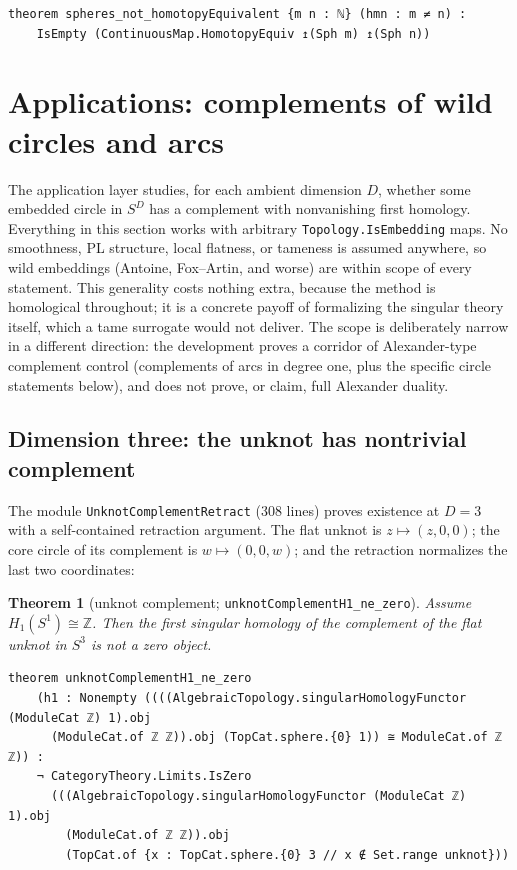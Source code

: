 \documentclass[11pt]{article}
\newtheorem{theorem}{Theorem}[section]
\theoremstyle{remark}
\newcommand{\Z}{\mathbb{Z}}
\newcommand{\leanname}[1]{\texttt{#1}}
\begin{document}
\begin{lstlisting}
theorem spheres_not_homotopyEquivalent {m n : ℕ} (hmn : m ≠ n) :
    IsEmpty (ContinuousMap.HomotopyEquiv ↥(Sph m) ↥(Sph n))
\end{lstlisting}

\section{Applications: complements of wild circles and arcs}
\label{sec:applications}

The application layer studies, for each ambient dimension $D$, whether some
embedded circle in $S^D$ has a complement with nonvanishing first homology.
Everything in this section works with arbitrary
\leanname{Topology.IsEmbedding} maps. No smoothness, PL structure, local
flatness, or tameness is assumed anywhere, so wild embeddings (Antoine,
Fox--Artin, and worse) are within scope of every statement. This generality
costs nothing extra, because the method is homological throughout; it is a
concrete payoff of formalizing the singular theory itself, which a tame
surrogate would not deliver. The scope is deliberately narrow in a different direction: the
development proves a corridor of Alexander-type complement control
(complements of arcs in degree one, plus the specific circle statements
below), and does not prove, or claim, full Alexander duality.

\subsection{Dimension three: the unknot has nontrivial complement}

The module \leanname{UnknotComplementRetract} (308 lines) proves existence
at $D = 3$ with a self-contained retraction argument. The flat unknot is
$z \mapsto (z, 0, 0)$; the core circle of its complement is
$w \mapsto (0, 0, w)$; and the retraction normalizes the last two
coordinates:

\begin{theorem}[unknot complement; \leanname{unknotComplementH1\_ne\_zero}]
\label{thm:unknot}
Assume $H_1(S^1) \cong \Z$. Then the first singular homology of the
complement of the flat unknot in $S^3$ is not a zero object.
\end{theorem}

\begin{lstlisting}
theorem unknotComplementH1_ne_zero
    (h1 : Nonempty ((((AlgebraicTopology.singularHomologyFunctor (ModuleCat ℤ) 1).obj
      (ModuleCat.of ℤ ℤ)).obj (TopCat.sphere.{0} 1)) ≅ ModuleCat.of ℤ ℤ)) :
    ¬ CategoryTheory.Limits.IsZero
      (((AlgebraicTopology.singularHomologyFunctor (ModuleCat ℤ) 1).obj
        (ModuleCat.of ℤ ℤ)).obj
        (TopCat.of {x : TopCat.sphere.{0} 3 // x ∉ Set.range unknot}))
\end{lstlisting}
\end{document}
